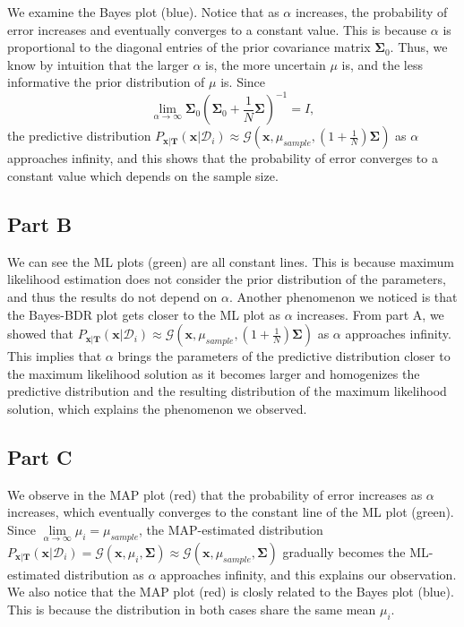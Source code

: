 \documentclass{article}
\newcommand*{\G}{\mathcal{G}}
\newcommand*{\D}{\mathcal{D}}
\begin{document}
We examine the Bayes plot (blue).
Notice that as $\alpha$ increases, the probability of error increases and eventually converges to a constant value.
This is because $\alpha$ is proportional to the diagonal entries of the prior covariance matrix $\mathbf{\Sigma}_0$.
Thus, we know by intuition that the larger $\alpha$ is, the more uncertain $\mu$ is, and the less informative the prior distribution of $\mu$ is. 
Since 
\[
    \lim\limits_{\alpha \to \infty} \mathbf{\Sigma}_0\left(\mathbf{\Sigma}_0 + \frac{1}{N}\mathbf{\Sigma}\right)^{-1} = I,
\]
the predictive distribution $P_{\mathbf{x}|\mathbf{T}}(\mathbf{x}|\D_i) \approx \G\left(\mathbf{x}, \mu_{sample}, \left(1 + \frac{1}{N}\right)\mathbf{\Sigma}\right)$ as $\alpha$ approaches infinity, and this shows that the probability of error converges to a constant value which depends on the sample size.

\subsection*{Part B}

We can see the ML plots (green) are all constant lines.
This is because maximum likelihood estimation does not consider the prior distribution of the parameters, and thus the results do not depend on $\alpha$.
Another phenomenon we noticed is that the Bayes-BDR plot gets closer to the ML plot as $\alpha$ increases.
From part A, we showed that $P_{\mathbf{x}|\mathbf{T}}(\mathbf{x}|\D_i) \approx \G\left(\mathbf{x}, \mu_{sample}, \left(1 + \frac{1}{N}\right)\mathbf{\Sigma}\right)$ as $\alpha$ approaches infinity.
This implies that $\alpha$ brings the parameters of the predictive distribution closer to the maximum likelihood solution as it becomes larger and homogenizes the predictive distribution and the resulting distribution of the maximum likelihood solution, which explains the phenomenon we observed.

\subsection*{Part C}

We observe in the MAP plot (red) that the probability of error increases as $\alpha$ increases, which eventually converges to the constant line of the ML plot (green).
Since $\lim\limits_{\alpha \to \infty} \mu_i = \mu_{sample}$, the MAP-estimated distribution $P_{\mathbf{x}|\mathbf{T}}(\mathbf{x}|\D_i) = \G(\mathbf{x}, \mu_{i}, \mathbf{\Sigma}) \approx \G(\mathbf{x}, \mu_{sample}, \mathbf{\Sigma})$ gradually becomes the ML-estimated distribution as $\alpha$ approaches infinity, and this explains our observation.
We also notice that the MAP plot (red) is closly related to the Bayes plot (blue).
This is because the distribution in both cases share the same mean $\mu_i$.
\end{document}
